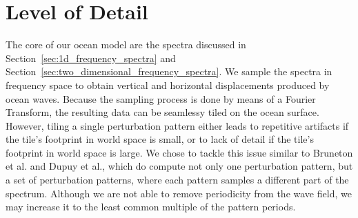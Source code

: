 \section{Level of Detail}

The core of our ocean model are the spectra discussed in 
Section~\ref{sec:1d_frequency_spectra} and 
Section~\ref{sec:two_dimensional_frequency_spectra}. We sample the spectra in 
frequency space to obtain vertical and horizontal displacements produced by 
ocean waves. Because the sampling process is done by means of a Fourier 
Transform, the resulting data can be seamlessy tiled on the ocean surface. 
However, tiling a single perturbation pattern either leads to repetitive 
artifacts if the tile's footprint in world space is small, or to lack of detail 
if the tile's footprint in world space is large. We chose to tackle this 
issue similar to Bruneton et al.\cite{misc:oceanlightingfft} and Dupuy et 
al.\cite{article:whitecaps}, which do compute not only one perturbation 
pattern, but a set of perturbation patterns, where each pattern samples a 
different part of the spectrum. Although we are not able to remove periodicity 
from the wave field, we may increase it to the least common multiple of the
pattern periods.

